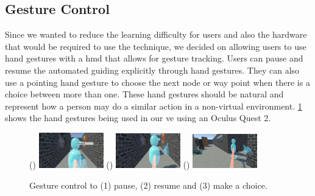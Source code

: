 \subsection{Gesture Control}
\label{subsection AGJ AJ: Gesture Control}
Since we wanted to reduce the learning difficulty for users and also the hardware that would be required to use the technique, we decided on allowing users to use hand gestures with a \acrshort{hmd} that allows for gesture tracking. Users can pause and resume the automated guiding explicitly through hand gestures. They can also use a pointing hand gesture to choose the next node or way point when there is a choice between more than one. These hand gestures should be natural and represent how a person may do a similar action in a non-virtual environment. \cref{fig:automated-jumping-gestures} shows the hand gestures being used in our \acrshort{ve} using an Oculus Quest 2.
\begin{figure}[]
	\centering
	() {\includegraphics[width=0.25\textwidth]{images/paused-gesture.pdf}}
	() {\includegraphics[width=0.25\textwidth]{images/resume-gesture.pdf}}
	() {\includegraphics[width=0.25\textwidth]{images/choice-gesture.pdf}} 
	\caption{Gesture control to (1) pause, (2) resume and (3) make a choice.}
	\label{fig:automated-jumping-gestures}
\end{figure} 